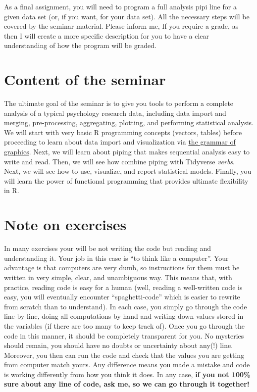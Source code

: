 \documentclass[
]{book}
\begin{document}
As a final assignment, you will need to program a full analysis pipi line for a given data set (or, if you want, for your data set). All the necessary steps will be covered by the seminar material. Please inform me, If you require a grade, as then I will create a more specific description for you to have a clear understanding of how the program will be graded.

\hypertarget{content-of-the-seminar}{%
\section*{Content of the seminar}\label{content-of-the-seminar}}

The ultimate goal of the seminar is to give you tools to perform a complete analysis of a typical psychology research data, including data import and merging, pre-processing, aggregating, plotting, and performing statistical analysis. We will start with very basic R programming concepts (vectors, tables) before proceeding to learn about data import and visualization via \href{https://ggplot2.tidyverse.org/}{the grammar of graphics}. Next, we will learn about piping that makes sequential analysis easy to write and read. Then, we will see how combine piping with Tidyverse \emph{verbs}. Next, we will see how to use, visualize, and report statistical models. Finally, you will learn the power of functional programming that provides ultimate flexibility in R.

\hypertarget{note-on-exercises}{%
\section*{Note on exercises}\label{note-on-exercises}}

In many exercises your will be not writing the code but reading and understanding it. Your job in this case is ``to think like a computer''. Your advantage is that computers are very dumb, so instructions for them must be written in very simple, clear, and unambiguous way. This means that, with practice, reading code is easy for a human (well, reading a well-written code is easy, you will eventually encounter ``spaghetti-code'' which is easier to rewrite from scratch than to understand). In each case, you simply go through the code line-by-line, doing all computations by hand and writing down values stored in the variables (if there are too many to keep track of). Once you go through the code in this manner, it should be completely transparent for you. No mysteries should remain, you should have no doubts or uncertainty about any(!) line. Moreover, you then can run the code and check that the values you are getting from computer match yours. Any difference means you made a mistake and code is working differently from how you think it does. In any case, \textbf{if you not 100\% sure about any line of code, ask me, so we can go through it together!}
\end{document}
